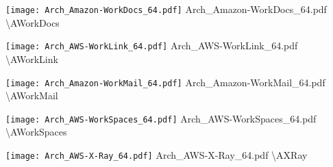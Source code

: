  {\texttt{[image: Arch\_Amazon-WorkDocs\_64.pdf]}} {Arch\_Amazon-WorkDocs\_64.pdf} {{\textbackslash}AWorkDocs}

 {\texttt{[image: Arch\_AWS-WorkLink\_64.pdf]}} {Arch\_AWS-WorkLink\_64.pdf} {{\textbackslash}AWorkLink}

 {\texttt{[image: Arch\_Amazon-WorkMail\_64.pdf]}} {Arch\_Amazon-WorkMail\_64.pdf} {{\textbackslash}AWorkMail}

 {\texttt{[image: Arch\_AWS-WorkSpaces\_64.pdf]}} {Arch\_AWS-WorkSpaces\_64.pdf} {{\textbackslash}AWorkSpaces}

 {\texttt{[image: Arch\_AWS-X-Ray\_64.pdf]}} {Arch\_AWS-X-Ray\_64.pdf} {{\textbackslash}AXRay}

\archEnd
